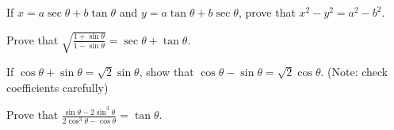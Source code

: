 \documentclass[12pt,a4paper]{exam}
\begin{document}
\begin{questions}
\question[5] If $x = a \sec \theta + b \tan \theta$ and $y = a \tan \theta + b \sec \theta$, prove that $x^2 - y^2 = a^2 - b^2$.
\vspace{0.15cm}

\question[5] Prove that $\sqrt{\frac{1 + \sin \theta}{1 - \sin \theta}} = \sec \theta + \tan \theta$.
\vspace{0.15cm}

\question[5] If $\cos \theta + \sin \theta = \sqrt{2} \sin \theta$, show that $\cos \theta - \sin \theta = \sqrt{2} \cos \theta$. (Note: check coefficients carefully)
\vspace{0.15cm}

\question[5] Prove that $\frac{\sin \theta - 2\sin^3 \theta}{2\cos^3 \theta - \cos \theta} = \tan \theta$.
\vspace{0.15cm}

\end{questions}
\bigskip
\end{document}
